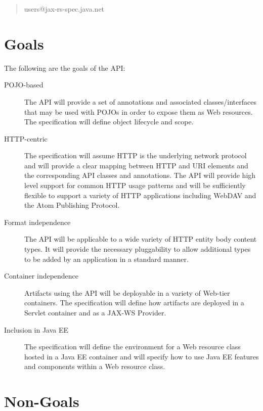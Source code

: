 \begin{quote}
users@jax-rs-spec.java.net
\end{quote}

\section{Goals}

The following are the goals of the API:

\begin{description}

\item[POJO-based] The API will provide a set of annotations and associated classes/interfaces that may be used with POJOs in order to expose them as Web resources. The specification will define object lifecycle and scope.

\item[HTTP-centric] The specification will assume HTTP\cite{http11} is the underlying network protocol and will provide a clear mapping between HTTP and URI\cite{uri} elements and the corresponding API classes and annotations. The API will provide high level support for common HTTP usage patterns and will be sufficiently flexible to support a variety of HTTP applications including WebDAV\cite{webdav} and the Atom Publishing Protocol\cite{atompub}.

\item[Format independence] The API will be applicable to a wide variety of HTTP entity body content types. It will provide the necessary pluggability to allow additional types to be added by an application in a standard manner.

\item[Container independence] Artifacts using the API will be deployable in a variety of Web-tier containers. The specification will define how artifacts are deployed in a Servlet\cite{servlet} container and as a JAX-WS\cite{jsr224} Provider.

\item[Inclusion in Java EE] The specification will define the environment for a Web resource class hosted in a Java EE container and will specify how to use Java EE features and components within a Web resource class.

\end{description}

\section{Non-Goals}
\label{non_goals}

